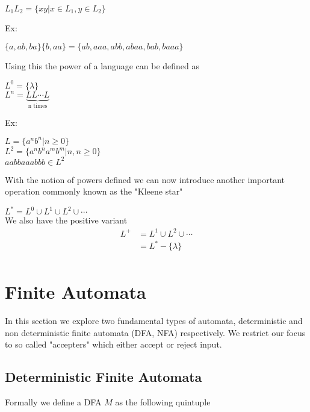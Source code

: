 \documentclass[11pt]{exam}
\begin{document}
\begin{center}
$L_1L_2 = \{xy | x \in L_1, y \in L_2 \}$
\end{center}

Ex:

\begin{center}
$\{a,ab,ba\}\{b,aa\} = \{ab,aaa,abb,abaa,bab,baaa\}$\\
\end{center}

Using this the power of a language can be defined as
\begin{center}
$L^0 = \{\lambda\}$\\
$L^n = \underbrace{LL \cdots L}_{\text{n times}}$\\
\end{center}

Ex:

\begin{center}
$L = \{a^nb^n | n \geq 0\}$\\
$L^2 = \{a^nb^na^mb^m | n,n \geq 0 \}$\\ 
$aabbaaabbb \in L^2$\\
\end{center}

With the notion of powers defined we can now introduce another important operation commonly known as the "Kleene star"

\begin{center}
$L^* = L^0 \cup L^1 \cup L^2 \cup \cdots$\\
We also have the positive variant
\begin{align*}
L^+ &= L^1 \cup L^2 \cup \cdots\\
	&= L^* - \{\lambda\}\\
\end{align*}
\end{center}

\newpage

\section{Finite Automata}

In this section we explore two fundamental types of automata, deterministic and non deterministic finite automata (DFA, NFA) respectively. We restrict our focus to so called "accepters" which either accept or reject input.



\subsection{Deterministic Finite Automata}
Formally we define a DFA $M$ as the following quintuple
\end{document}
